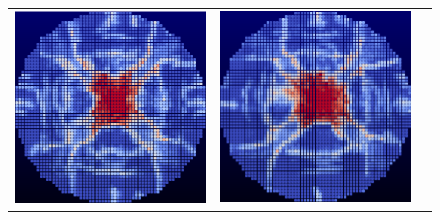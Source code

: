 \begin{figure}
  \centering
  \begin{tabular}{ccc}
  \includegraphics[scale=0.75]{figure/New_Solutions/true_soln_1510.eps} &
  \includegraphics[scale=0.75]{figure/New_Solutions/true_soln_1511.eps} &

\end{tabular}
\end{figure}

